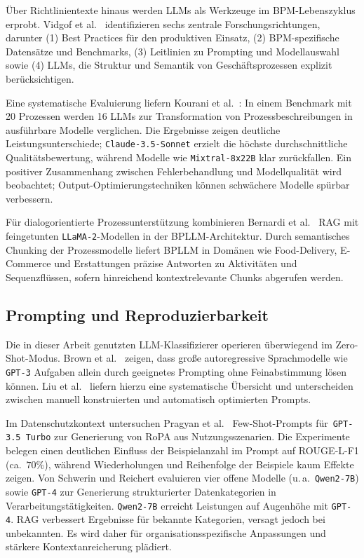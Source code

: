 Über Richtlinientexte hinaus werden \acp{LLM} als Werkzeuge im \ac{BPM}-Lebenszyklus erprobt. Vidgof et al.\ \cite{vidgof2023largelanguagemodelsbusiness} identifizieren sechs zentrale Forschungsrichtungen, darunter (1) Best Practices für den produktiven Einsatz, (2) \ac{BPM}-spezifische Datensätze und Benchmarks, (3) Leitlinien zu Prompting und Modellauswahl sowie (4) \acp{LLM}, die Struktur und Semantik von Geschäftsprozessen explizit berücksichtigen.

Eine systematische Evaluierung liefern Kourani et al.\ \cite{kourani2025evaluating}: In einem Benchmark mit 20 Prozessen werden 16 \acp{LLM} zur Transformation von Prozessbeschreibungen in ausführbare Modelle verglichen. Die Ergebnisse zeigen deutliche Leistungsunterschiede; \texttt{Claude-3.5-Sonnet} erzielt die höchste durchschnittliche Qualitätsbewertung, während Modelle wie \texttt{Mixtral-8x22B} klar zurückfallen. Ein positiver Zusammenhang zwischen Fehlerbehandlung und Modellqualität wird beobachtet; Output-Optimierungstechniken können schwächere Modelle spürbar verbessern.

Für dialogorientierte Prozessunterstützung kombinieren Bernardi et al.\ \cite{bernardi2024conversing} \ac{RAG} mit feingetunten \texttt{LLaMA-2}-Modellen in der BPLLM-Architektur. Durch semantisches Chunking der Prozessmodelle liefert BPLLM in Domänen wie Food-Delivery, E-Commerce und Erstattungen präzise Antworten zu Aktivitäten und Sequenzflüssen, sofern hinreichend kontextrelevante Chunks abgerufen werden.

\subsection*{Prompting und Reproduzierbarkeit}

Die in dieser Arbeit genutzten \ac{LLM}-Klassifizierer operieren überwiegend im Zero-Shot-Modus. Brown et al.\ \cite{brown2020fewshot} zeigen, dass große autoregressive Sprachmodelle wie \texttt{GPT-3} Aufgaben allein durch geeignetes Prompting ohne Feinabstimmung lösen können. Liu et al.\ \cite{liu2023prompting} liefern hierzu eine systematische Übersicht und unterscheiden zwischen manuell konstruierten und automatisch optimierten Prompts.

Im Datenschutzkontext untersuchen Pragyan et al.\ \cite{pragyan2024toward} Few-Shot-Prompts für\linebreak~\texttt{GPT-3.5 Turbo} zur Generierung von \ac{RoPA} aus Nutzungsszenarien. Die Experimente belegen einen deutlichen Einfluss der Beispielanzahl im Prompt auf ROUGE-L-F1 (ca.~$70$\%), während Wiederholungen und Reihenfolge der Beispiele kaum Effekte zeigen. Von Schwerin und Reichert \cite{schwerin2024systematic} evaluieren vier offene Modelle (u.\,a.\ \texttt{Qwen2-7B}) sowie \texttt{GPT-4} zur Generierung strukturierter Datenkategorien in Verarbeitungstätigkeiten. \texttt{Qwen2-7B} erreicht Leistungen auf Augenhöhe mit \texttt{GPT-4}. \ac{RAG} verbessert Ergebnisse für bekannte Kategorien, versagt jedoch bei unbekannten. Es wird daher für organisationsspezifische Anpassungen und stärkere Kontextanreicherung plädiert.

